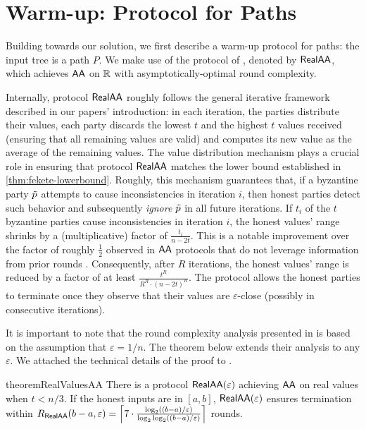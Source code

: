 \section{Warm-up: Protocol for Paths}\label{section:warmup}

Building towards our solution, we first describe a warm-up protocol for paths: the input tree is a path $P$.
We make use of the protocol of \cite{BenDoHo10}, denoted by $\textsf{RealAA}$, which achieves $\textsf{AA}$ on $\mathbb{R}$ with asymptotically-optimal round complexity.

Internally, protocol $\textsf{RealAA}$ roughly follows the general iterative framework described in our papers' introduction: in each iteration, the parties distribute their values, each party discards the lowest $t$ and the highest $t$ values received (ensuring that all remaining values are valid) and computes its new value as the average of the remaining values. The value distribution mechanism plays a crucial role in ensuring that protocol $\textsf{RealAA}$ matches the lower bound established in \cref{thm:fekete-lowerbound}. Roughly, this mechanism guarantees that, if a byzantine party $\tilde{p}$ attempts to cause inconsistencies in iteration $i$, then honest parties detect such behavior and subsequently \emph{ignore} $\tilde{p}$ in all future iterations. If $t_i$ of the $t$ byzantine parties cause inconsistencies in iteration $i$, the honest values' range shrinks by a (multiplicative) factor of $\frac{t_i}{n - 2t}$. This is a notable improvement over the factor of roughly $\frac{1}{2}$ observed in $\textsf{AA}$ protocols that do not leverage information from prior rounds \cite{JACM:DLPSW86}. Consequently, after $R$ iterations, the honest values' range is reduced by a factor of at least $\frac{t^R}{R^R \cdot (n - 2t)^R}$. The protocol allows the honest parties to terminate once they observe that their values are $\varepsilon$-close (possibly in consecutive iterations).


It is important to note that the round complexity analysis presented in \cite{BenDoHo10} is based on the assumption that $\varepsilon = 1/n$. The theorem below extends their analysis to any $\varepsilon$. We attached the technical details of the proof to .
\begin{restatable}{theorem}{RealValuesAA}\label{theorem:real-values-aa}
    There is a protocol $\textsf{RealAA}(\varepsilon)$ achieving $\textsf{AA}$ on real values when $t < n / 3$. If the honest inputs are in $[a, b]$, $\textsf{RealAA}(\varepsilon)$ ensures termination within $R_{\textsf{RealAA}}(b - a, \varepsilon) = \left\lceil 7 \cdot \frac{\log_2 ((b - a)/\varepsilon)}{\log_2 \log_2 ((b - a)/\varepsilon)} \right\rceil$ rounds.
\end{restatable}


